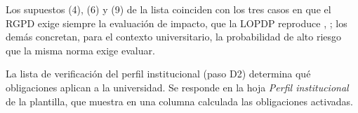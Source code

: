 Los supuestos (4), (6) y (9) de la lista coinciden con los tres casos en que el RGPD exige siempre la evaluación de impacto, que la LOPDP reproduce \cite[art.~35]{rgpd2016}, \cite[art.~42]{lopdp2021}; los demás concretan, para el contexto universitario, la probabilidad de alto riesgo que la misma norma exige evaluar.

\label{anx:perfil}

La lista de verificación del perfil institucional (paso D2) determina qué obligaciones aplican a la universidad. Se responde en la hoja \textit{Perfil institucional} de la plantilla, que muestra en una columna calculada las obligaciones activadas.



